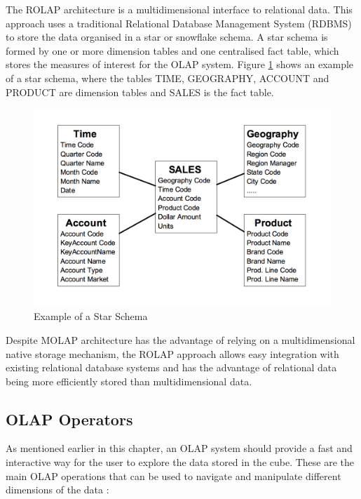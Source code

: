 The ROLAP architecture is a multidimensional interface to relational data. This approach uses a traditional Relational Database Management System (RDBMS) to store the data organised in a star or snowflake schema. A star schema is formed by one or more dimension tables and one centralised fact table, which stores the measures of interest for the OLAP system. Figure \ref{fig:figure3} shows an example of a star schema, where the tables TIME, GEOGRAPHY, ACCOUNT and PRODUCT are dimension tables and SALES is the fact table.

\begin{figure}[ht]
\centering
\includegraphics[width=.8\textwidth]{../star_schema_example.png}
\caption{Example of a Star Schema  \cite{Vassiliadis1999}}
\label{fig:figure3}
\end{figure}

Despite MOLAP architecture has the advantage of relying on a multidimensional native storage mechanism, the ROLAP approach allows easy integration with existing relational database systems and has the advantage of relational data being more efficiently stored than multidimensional data.

\subsection{OLAP Operators}
As mentioned earlier in this chapter, an OLAP system should provide a fast and interactive way for the user to explore the data stored in the cube. These are the main OLAP operations that can be used to navigate and manipulate different dimensions of the data \cite{Vassiliadis1998}:

